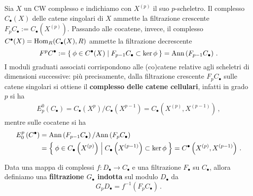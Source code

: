 \begin{ex}
	Sia $X$ un CW complesso e indichiamo con $X^{(p)}$ il suo $p$-scheletro.
	Il complesso $C_{\bullet}(X)$ delle catene singolari di $X$ ammette 
	la filtrazione crescente $F_{p}C_{\bullet} := C_{\bullet}\left( X^{(p)} \right)$.
	Passando alle cocatene, invece, il complesso $C^{\bullet}(X) = \operatorname{Hom}_{R}(C_{\bullet}(X),R)$
	ammette la filtrazione decrescente
	\begin{equation*}
		F^{p}C^{\bullet} := \Set{\phi \in C^{\bullet}(X) | F_{p-1}C_{\bullet} \subset \ker \phi}
		= \mathrm{Ann}\left( F_{p-1}C_{\bullet} \right)\,.
	\end{equation*}
	I moduli graduati associati corrispondono alle (co)catene relative agli scheletri di
	dimensioni successive: più precisamente, 
	dalla filtrazione crescente $F_{p}C_{\bullet}$ sulle catene singolari
	si ottiene %
	il \textbf{complesso delle catene cellulari},
	infatti in grado $p$ si ha
	\begin{align*}
		E^{0}_{p}\left(C_{\bullet}\right) 
		= C_{\bullet}\left( X^{p} \right) / C_{\bullet}\left( X^{p-1} \right) 
		= C_{\bullet}\left( X^{(p)}, X^{(p-1)} \right)\,,
	\end{align*}
	mentre sulle cocatene si ha
	\begin{align*}
		E_{0}^{p}\left(C^{\bullet}\right) 
		&=  \mathrm{Ann}\left( F_{p-1}C_{\bullet} \right) / \mathrm{Ann}\left( F_{p}C_{\bullet} \right) \\
		&= \Set{\phi \in C_{\bullet}\left( X^{(p)} \right) | C_{\bullet}\left(X^{(p-1)}\right) \subset \ker \phi}
		= C^{\bullet}\left( X^{(p)}, X^{(p-1)} \right)\,.
	\end{align*}
\end{ex}

\begin{df}
	Data una mappa di complessi $f:D_{\bullet} \to C_{\bullet}$
	e una filtrazione $F_{\bullet}$ su $C_{\bullet}$,
	allora definiamo una \textbf{filtrazione $G_{\bullet}$
	indotta} sul modulo $D_{\bullet}$ da
	\begin{equation*}
		G_{p}D_{\bullet} = f^{-1}\left(F_{p}C_{\bullet}\right)\,.
	\end{equation*}
\end{df}

